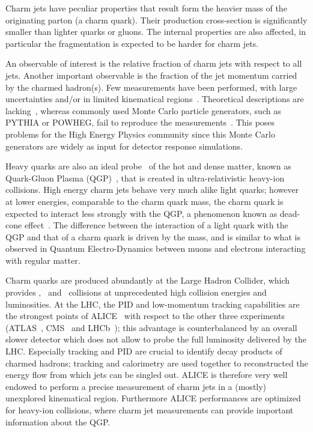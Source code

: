 \documentclass[12pt, a4paper, twoside, titlepage]{article}
\begin{document}
Charm jets have peculiar properties that result form the heavier mass of the originating parton (a charm quark).
Their production cross-section is significantly smaller than lighter quarks or gluons. The internal
properties are also affected, in particular the fragmentation is expected to be harder for charm jets.

An observable of interest is the relative fraction of charm jets with respect to all jets. Another important observable is the fraction of the jet momentum carried by
the charmed hadron(s). Few measurements have been performed, 
with large uncertainties and/or in limited kinematical regions~\cite{}. Theoretical descriptions are lacking~\cite{}, whereas commonly used Monte Carlo particle
generators, such as PYTHIA or POWHEG, fail to reproduce the measurements~\cite{}. 
This poses problems for the High Energy Physics community since this Monte Carlo generators are widely as input for detector response simulations.

Heavy quarks are also an ideal probe~\cite{} of the hot and dense matter, known as Quark-Gluon Plasma (QGP)~\cite{}, that is created in ultra-relativistic heavy-ion collisions. 
High energy charm jets behave very much alike light quarks; however at lower energies, comparable to the charm quark mass, the charm quark is expected
to interact less strongly with the QGP, a phenomenon known as dead-cone effect~\cite{}. The difference between the interaction of a light quark with the QGP and that of
a charm quark is driven by the mass, and is similar to what is observed in Quantum Electro-Dynamics between muons and electrons interacting with regular matter.

Charm quarks are produced abundantly at the Large Hadron Collider, which provides \pp, \pPb\ and \PbPb\ collisions at unprecedented high collision energies and luminosities.
At the LHC, the PID and low-momentum tracking capabilities are the strongest points of ALICE~\cite{} with respect to the other three experiments (ATLAS~\cite{}, CMS~\cite{} and LHCb~\cite{}); 
this advantage is counterbalanced by an overall slower detector which does not allow to probe the full luminosity delivered by the LHC. 
Especially tracking and PID are crucial to identify decay products of charmed hadrons; tracking and calorimetry are used together to reconstructed the energy flow from which jets can be singled out.
ALICE is therefore very well endowed to perform a precise measurement of charm jets in a (mostly) unexplored kinematical region. Furthermore ALICE performances
are optimized for heavy-ion collisions, where charm jet measurements can provide important information about the QGP.
\end{document}
